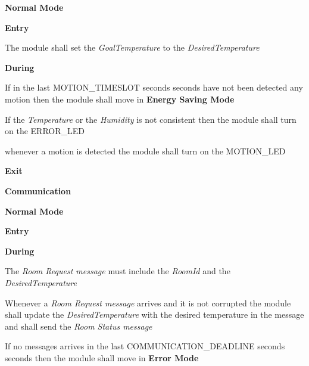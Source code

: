 \begin{req_enum}
\begin{req_enum}[label*=\arabic*.]
					\item \textbf{Normal Mode}
						\begin{req_enum}[label*=\arabic*.]
							\item \textbf{Entry}
								\begin{req_enum}[label*=\arabic*.]
									\item The module shall set the \textit{GoalTemperature} to the \textit{DesiredTemperature}
								\end{req_enum}
							\item \textbf{During}
								\begin{req_enum}[label*=\arabic*.]
									\item If in the last MOTION\_TIMESLOT seconds  seconds have not been detected any motion then the module shall move in \textbf{Energy Saving Mode}
									\item If the \textit{Temperature} or the \textit{Humidity} is not consistent then the module shall turn on the ERROR\_LED
									\item whenever a motion is detected the module shall turn on the MOTION\_LED
								\end{req_enum}

							\item \textbf{Exit}
						\end{req_enum}
				\end{req_enum}

			\item \textbf{Communication}
				\begin{req_enum}[label*=\arabic*.]
					\item \textbf{Normal Mode}
						\begin{req_enum}[label*=\arabic*.]
							\item \textbf{Entry}
							\item \textbf{During}
								\begin{req_enum}[label*=\arabic*.]
									\item The \textit{Room Request message} must include the \textit{RoomId} and the \textit{DesiredTemperature}
									\item Whenever a \textit{Room Request message} arrives and it is not corrupted the module shall update the \textit{DesiredTemperature} with the desired temperature in the message and shall send the \textit{Room Status message}
									\item If no messages arrives in the last COMMUNICATION\_DEADLINE seconds  seconds then the module shall move in \textbf{Error Mode}
								\end{req_enum}
	

\end{req_enum}
\end{req_enum}
\end{req_enum}
